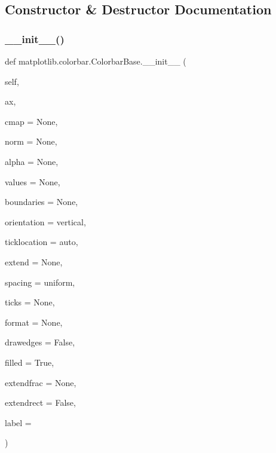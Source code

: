 \subsection{Constructor \& Destructor Documentation}
\mbox{\label{classmatplotlib_1_1colorbar_1_1ColorbarBase_ab4493c997fc4ccbdf0a5ef431c2c4324}} 
\subsubsection{\texorpdfstring{\+\_\+\+\_\+init\+\_\+\+\_\+()}{\_\_init\_\_()}}
{\footnotesize\ttfamily def matplotlib.\+colorbar.\+Colorbar\+Base.\+\_\+\+\_\+init\+\_\+\+\_\+ (\begin{DoxyParamCaption}\item[{}]{self,  }\item[{}]{ax,  }\item[{}]{cmap = {\ttfamily None},  }\item[{}]{norm = {\ttfamily None},  }\item[{}]{alpha = {\ttfamily None},  }\item[{}]{values = {\ttfamily None},  }\item[{}]{boundaries = {\ttfamily None},  }\item[{}]{orientation = {\ttfamily \textquotesingle{}vertical\textquotesingle{}},  }\item[{}]{ticklocation = {\ttfamily \textquotesingle{}auto\textquotesingle{}},  }\item[{}]{extend = {\ttfamily None},  }\item[{}]{spacing = {\ttfamily \textquotesingle{}uniform\textquotesingle{}},  }\item[{}]{ticks = {\ttfamily None},  }\item[{}]{format = {\ttfamily None},  }\item[{}]{drawedges = {\ttfamily False},  }\item[{}]{filled = {\ttfamily True},  }\item[{}]{extendfrac = {\ttfamily None},  }\item[{}]{extendrect = {\ttfamily False},  }\item[{}]{label = {\ttfamily \textquotesingle{}\textquotesingle{}} }\end{DoxyParamCaption})}



